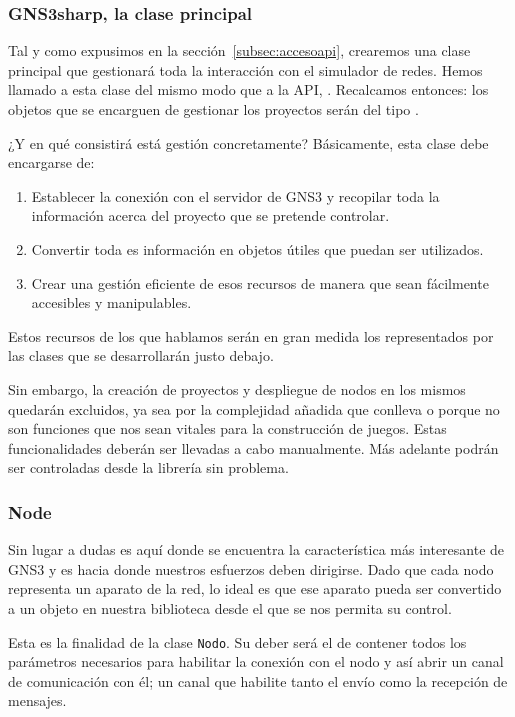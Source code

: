 \subsubsection[''La clase principal'']{GNS3sharp, la clase principal}
Tal y como expusimos en la sección~\ref{subsec:accesoapi}, crearemos una clase principal que gestionará toda la interacción con el simulador de redes. Hemos llamado a esta clase del mismo modo que a la API, \GNSCS. Recalcamos entonces: los objetos que se encarguen de gestionar los proyectos serán del tipo \GNSCS.

¿Y en qué consistirá está gestión concretamente? Básicamente, esta clase debe encargarse de:
\begin{enumerate}
\item Establecer la conexión con el servidor de GNS3 y recopilar toda la información acerca del proyecto que se pretende controlar.
\item Convertir toda es información en objetos útiles que puedan ser utilizados.
\item Crear una gestión eficiente de esos recursos de manera que sean fácilmente accesibles y manipulables.
\end{enumerate}

Estos recursos de los que hablamos serán en gran medida los representados por las clases que se desarrollarán justo debajo.

Sin embargo, la creación de proyectos y despliegue de nodos en los mismos quedarán excluidos, ya sea por la complejidad añadida que conlleva o porque no son funciones que nos sean vitales para la construcción de juegos. Estas funcionalidades deberán ser llevadas a cabo manualmente. Más adelante podrán ser controladas desde la librería sin problema.

\subsubsection{Node}
Sin lugar a dudas es aquí donde se encuentra la característica más interesante de GNS3 y es hacia donde nuestros esfuerzos deben dirigirse. Dado que cada nodo representa un aparato de la red, lo ideal es que ese aparato pueda ser convertido a un objeto en nuestra biblioteca desde el que se nos permita su control. 

Esta es la finalidad de la clase \texttt{Nodo}. Su deber será el de contener todos los parámetros necesarios para habilitar la conexión con el nodo y así abrir un canal de comunicación con él; un canal que habilite tanto el envío como la recepción de mensajes.

